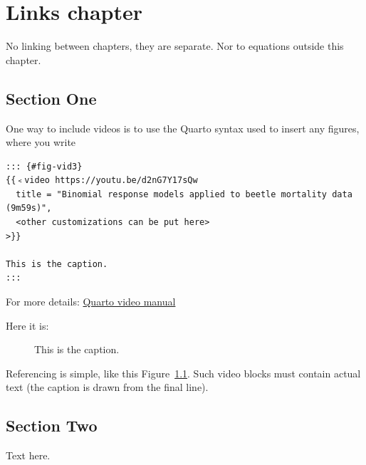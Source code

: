 \documentclass[
  a4paper,
  DIV=11,
  numbers=noendperiod,
  oneside]{scrreport}
\author{}
\date{}
\begin{document}
\chapter{Links chapter}\label{sec-links}

No linking between chapters, they are separate. Nor to equations outside
this chapter.

\section{Section One}\label{section-one}

One way to include videos is to use the Quarto syntax used to insert any
figures, where you write

\begin{verbatim}
::: {#fig-vid3}
{{﹤video https://youtu.be/d2nG7Y17sQw 
  title = "Binomial response models applied to beetle mortality data (9m59s)",
  <other customizations can be put here>
>}}

This is the caption.
:::
\end{verbatim}

For more details:
\href{https://quarto.org/docs/authoring/videos.html}{Quarto video
manual}

Here it is:

\begin{figure}


\caption{\label{fig-vid3}This is the caption.}

\end{figure}%

Referencing is simple, like this Figure~\ref{fig-vid3}. Such video
blocks must contain actual text (the caption is drawn from the final
line).

\section{Section Two}\label{section-two}

Text here.
\end{document}
